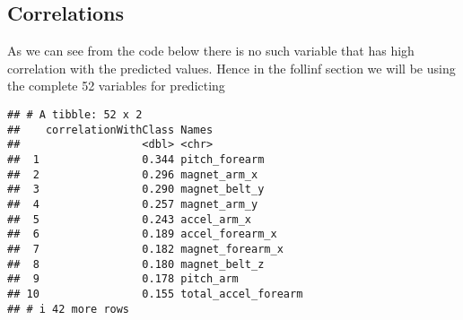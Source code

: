 \documentclass[
]{article}
\newenvironment{Shaded}{\begin{snugshade}}{\end{snugshade}}
\newcommand{\AttributeTok}[1]{\textcolor[rgb]{0.13,0.29,0.53}{#1}}
\newcommand{\CommentTok}[1]{\textcolor[rgb]{0.56,0.35,0.01}{\textit{#1}}}
\newcommand{\ControlFlowTok}[1]{\textcolor[rgb]{0.13,0.29,0.53}{\textbf{#1}}}
\newcommand{\FunctionTok}[1]{\textcolor[rgb]{0.13,0.29,0.53}{\textbf{#1}}}
\newcommand{\NormalTok}[1]{#1}
\newcommand{\OtherTok}[1]{\textcolor[rgb]{0.56,0.35,0.01}{#1}}
\newcommand{\SpecialCharTok}[1]{\textcolor[rgb]{0.81,0.36,0.00}{\textbf{#1}}}
\newcommand{\StringTok}[1]{\textcolor[rgb]{0.31,0.60,0.02}{#1}}
\begin{document}
\subsection{Correlations}\label{correlations}

As we can see from the code below there is no such variable that has
high correlation with the predicted values. Hence in the follinf section
we will be using the complete 52 variables for predicting

\begin{Shaded}
\end{Shaded}

\begin{verbatim}
## # A tibble: 52 x 2
##    correlationWithClass Names              
##                   <dbl> <chr>              
##  1                0.344 pitch_forearm      
##  2                0.296 magnet_arm_x       
##  3                0.290 magnet_belt_y      
##  4                0.257 magnet_arm_y       
##  5                0.243 accel_arm_x        
##  6                0.189 accel_forearm_x    
##  7                0.182 magnet_forearm_x   
##  8                0.180 magnet_belt_z      
##  9                0.178 pitch_arm          
## 10                0.155 total_accel_forearm
## # i 42 more rows
\end{verbatim}
\end{document}
